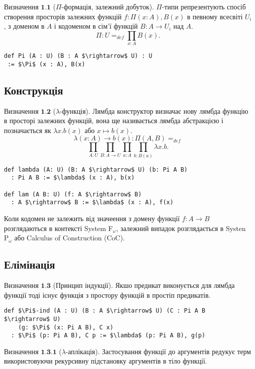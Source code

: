 \documentclass{article}
\theoremstyle{definition}
\begin{document}
$\textbf{Визначення\ 1.1}$ ($\Pi$-формація, залежний добуток).
$\Pi$-типи репрезентують спосіб створення просторів залежних функцій  $f: \Pi(x:A), B(x)$ в певному всесвіті $U_i$,
з доменом в $A$ і кодоменом в сім'ї функцій $B : A \rightarrow U_i$ над $A$.
$$
   \Pi : U =_{def} \prod_{x:A}B(x).
$$
\begin{lstlisting}[mathescape=true]
def Pi (A : U) (B : A $\rightarrow$ U) : U
 := $\Pi$ (x : A), B(x)
\end{lstlisting}

\subsection{Конструкція}

$\textbf{Визначення\ 1.2}$ ($\lambda$-функція).
Лямбда конструктор визначає нову лямбда функцію в просторі залежних функцій,
вона ще називається лямбда абстракцією і позначається як $\lambda x. b(x)$ або $x \mapsto b(x)$.
$$
    \lambda (x: A) \rightarrow b(x) : \Pi(A,B) =_{def}
$$
$$
    \prod_{A:U}\prod_{B:A \rightarrow U}\prod_{a: A}\prod_{b:B(a)}\lambda x.b.
$$
\begin{lstlisting}[mathescape=true]
def lambda (A: U) (B: A $\rightarrow$ U) (b: Pi A B)
  : Pi A B := $\lambda$ (x : A), b(x)

def lam (A B: U) (f: A $\rightarrow$ B)
  : A $\rightarrow$ B := $\lambda$ (x : A), f(x)
\end{lstlisting}

Коли кодомен не залежить від значеення з домену функції $f: A \rightarrow B$
розглядаються в контексті System F$_\omega$, залежний випадок розглядається
в  Systen P$_\omega$ або Calculus of Construction (CoC).

\newpage
\subsection{Елімінація}

$\textbf{Визначення\ 1.3}$ (Принцип індукції). Якшо предикат виконується для
лямбда функції тоді існує функція з простору функцій в простіп предикатів.

\begin{lstlisting}[mathescape=true]
def $\Pi$-ind (A : U) (B : A $\rightarrow$ U) (C : Pi A B $\rightarrow$ U)
    (g: $\Pi$ (x: Pi A B), C x)
  : $\Pi$ (p: Pi A B), C p := $\lambda$ (p: Pi A B), g(p)
\end{lstlisting}

\noindent $\textbf{Визначення\ 1.3.1}$ ($\lambda$-аплікація).
Застосування функції до аргументів редукує терм
використовуючи рекурсивну підстановку аргументів в тіло функції.
\end{document}
